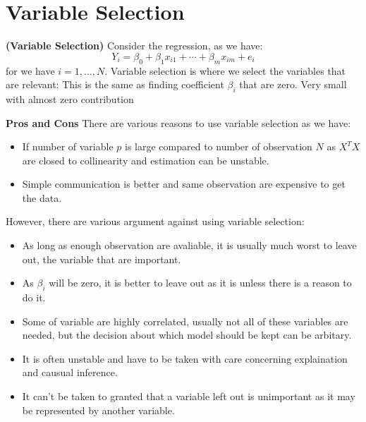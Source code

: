 \section{Variable Selection}

\begin{remark}{\textbf{(Variable Selection)}}
    Consider the regression, as we have: 
    \begin{equation*}
        Y_i = \beta_0 + \beta_1x_{i1} + \cdots + \beta_mx_{im} + e_i
    \end{equation*}
    for we have $i=1,\dots,N$. Variable selection is where we select the variables that are relevant: This is the same as finding coefficient $\beta_i$ that are zero. Very small with almost zero contribution
\end{remark}

\begin{remark}{\textbf{Pros and Cons}}
    There are various reasons to use variable selection as we have:
    \begin{itemize}
        \item If number of variable $p$ is large compared to number of observation $N$ as $X^TX$ are closed to collinearity and estimation can be unstable. 
        \item Simple communication is better and same observation are expensive to get the data. 
    \end{itemize}
    However, there are various argument against using variable selection:
    \begin{itemize}
        \item As long as enough observation are avaliable, it is usually much worst to leave out, the variable that are important. 
        \item As $\beta_i$ will be zero, it is better to leave out as it is unless there is a reason to do it. 
        \item Some of variable are highly correlated, usually not all of these variables are needed, but the decision about which model should be kept can be arbitary. 
        \item It is often unstable and have to be taken with care concerning explaination and causual inference. 
        \item It can't be taken to granted that a variable left out is unimportant as it may be represented by another variable.
    \end{itemize}
\end{remark}


